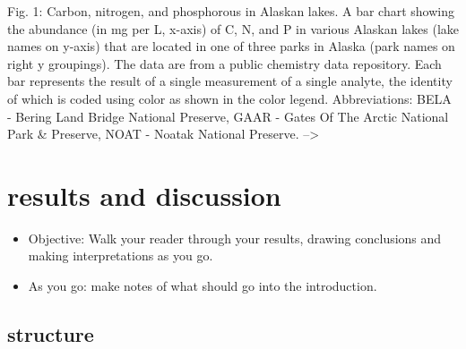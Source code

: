 \documentclass[
]{krantz}
\providecommand{\tightlist}{%
  \setlength{\itemsep}{0pt}\setlength{\parskip}{0pt}}
\begin{document}
Fig. 1: Carbon, nitrogen, and phosphorous in Alaskan lakes. A bar chart showing the abundance (in mg per L, x-axis) of C, N, and P in various Alaskan lakes (lake names on y-axis) that are located in one of three parks in Alaska (park names on right y groupings). The data are from a public chemistry data repository. Each bar represents the result of a single measurement of a single analyte, the identity of which is coded using color as shown in the color legend. Abbreviations: BELA - Bering Land Bridge National Preserve, GAAR - Gates Of The Arctic National Park \& Preserve, NOAT - Noatak National Preserve. --\textgreater{}

\hypertarget{results-and-discussion}{%
\section{results and discussion}\label{results-and-discussion}}

\begin{itemize}
\tightlist
\item
  Objective: Walk your reader through your results, drawing conclusions and making interpretations as you go.
\end{itemize}

\begin{itemize}
\tightlist
\item
  As you go: make notes of what should go into the introduction.
\end{itemize}

\hypertarget{structure}{%
\subsection{structure}\label{structure}}
\end{document}
